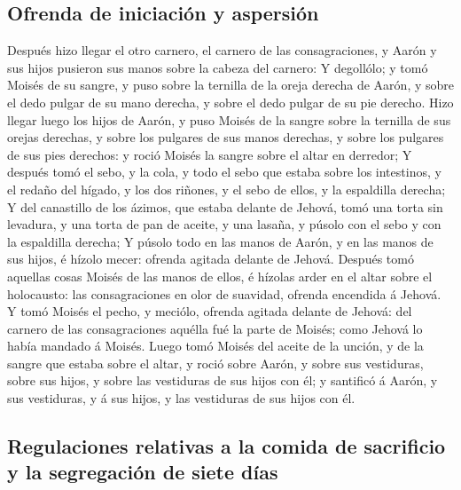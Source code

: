 \hypertarget{ofrenda-de-iniciaciuxf3n-y-aspersiuxf3n}{%
\subsection{Ofrenda de iniciación y
aspersión}\label{ofrenda-de-iniciaciuxf3n-y-aspersiuxf3n}}

 Después hizo llegar el otro carnero, el carnero de las
consagraciones, y Aarón y sus hijos pusieron sus manos sobre la cabeza
del carnero:  Y degollólo; y tomó Moisés de su sangre, y
puso sobre la ternilla de la oreja derecha de Aarón, y sobre el dedo
pulgar de su mano derecha, y sobre el dedo pulgar de su pie derecho.
 Hizo llegar luego los hijos de Aarón, y puso Moisés de
la sangre sobre la ternilla de sus orejas derechas, y sobre los pulgares
de sus manos derechas, y sobre los pulgares de sus pies derechos: y
roció Moisés la sangre sobre el altar en derredor;  Y
después tomó el sebo, y la cola, y todo el sebo que estaba sobre los
intestinos, y el redaño del hígado, y los dos riñones, y el sebo de
ellos, y la espaldilla derecha;  Y del canastillo de los
ázimos, que estaba delante de Jehová, tomó una torta sin levadura, y una
torta de pan de aceite, y una lasaña, y púsolo con el sebo y con la
espaldilla derecha;  Y púsolo todo en las manos de Aarón,
y en las manos de sus hijos, é hízolo mecer: ofrenda agitada delante de
Jehová.  Después tomó aquellas cosas Moisés de las manos
de ellos, é hízolas arder en el altar sobre el holocausto: las
consagraciones en olor de suavidad, ofrenda encendida á Jehová.
 Y tomó Moisés el pecho, y meciólo, ofrenda agitada
delante de Jehová: del carnero de las consagraciones aquélla fué la
parte de Moisés; como Jehová lo había mandado á Moisés. 
Luego tomó Moisés del aceite de la unción, y de la sangre que estaba
sobre el altar, y roció sobre Aarón, y sobre sus vestiduras, sobre sus
hijos, y sobre las vestiduras de sus hijos con él; y santificó á Aarón,
y sus vestiduras, y á sus hijos, y las vestiduras de sus hijos con él.

\hypertarget{regulaciones-relativas-a-la-comida-de-sacrificio-y-la-segregaciuxf3n-de-siete-duxedas}{%
\subsection{Regulaciones relativas a la comida de sacrificio y la
segregación de siete
días}\label{regulaciones-relativas-a-la-comida-de-sacrificio-y-la-segregaciuxf3n-de-siete-duxedas}}

